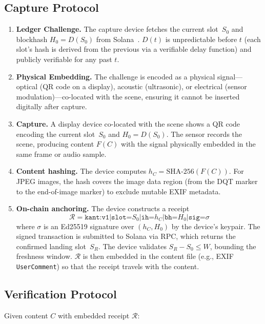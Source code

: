 \documentclass[11pt]{article}
\begin{document}
\subsection{Capture Protocol}

\begin{enumerate}
  \item \textbf{Ledger Challenge.} The capture device fetches the current
    slot~$S_0$ and blockhash $H_0 = D(S_0)$ from Solana~\cite{solana}.
    $D(t)$ is unpredictable before $t$ (each slot's hash is derived from the
    previous via a verifiable delay function) and publicly verifiable for any
    past $t$.
  \item \textbf{Physical Embedding.} The challenge is encoded as a physical
    signal---optical (QR code on a display), acoustic (ultrasonic), or
    electrical (sensor modulation)---co-located with the scene, ensuring it
    cannot be inserted digitally after capture.
  \item \textbf{Capture.} A display device co-located with the scene shows a
    QR code encoding the current slot~$S_0$ and $H_0 = D(S_0)$. The sensor
    records the scene, producing content $F(C)$ with the signal physically
    embedded in the same frame or audio sample.
  \item \textbf{Content hashing.} The device computes $h_C =
    \mathrm{SHA\text{-}256}(F(C))$. For JPEG images, the hash covers the
    image data region (from the DQT marker to the end-of-image marker) to
    exclude mutable EXIF metadata.
  \item \textbf{On-chain anchoring.} The device constructs a receipt
    \[
      \mathcal{R} = \texttt{kant:v1|slot=}S_0\texttt{|ih=}h_C\texttt{|bh=}H_0\texttt{|sig=}\sigma
    \]
    where $\sigma$ is an Ed25519 signature over $(h_C, H_0)$ by the device's
    keypair. The signed transaction is submitted to Solana via RPC, which
    returns the confirmed landing slot~$S_R$. The device validates
    $S_R - S_0 \leq W$, bounding the freshness window.
    $\mathcal{R}$ is then embedded in the content file (e.g., EXIF
    \texttt{UserComment}) so that the receipt travels with the content.
\end{enumerate}

\subsection{Verification Protocol}
\label{sec:verify}

Given content $C$ with embedded receipt $\mathcal{R}$:
\end{document}
